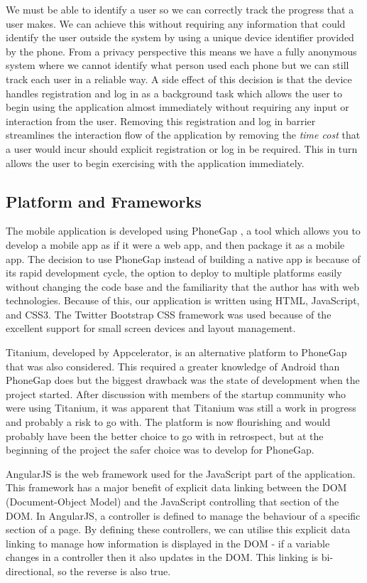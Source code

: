 We must be able to identify a user so we can correctly track the
progress that a user makes. We can achieve this without requiring any
information that could identify the user outside the system by using a
unique device identifier provided by the phone. From a privacy 
perspective this means we have a fully anonymous system where we
cannot identify what person used each phone but we can still track
each user in a reliable way. A side effect of this decision is that
the device handles registration and log in as a background task which
allows the user to begin using the application almost immediately
without requiring any input or interaction from the user. Removing
this registration and log in barrier streamlines the interaction flow
of the application by removing the \emph{time cost} that a user would
incur should explicit registration or log in be required. This in turn
allows the user to begin exercising with the application immediately.

\subsection{Platform and Frameworks}
The mobile application is developed using PhoneGap \cite{phonegap}, 
a tool which allows you to develop a mobile app as if it were
a web app, and then package it as a mobile app. The decision to use
PhoneGap instead of building a native app is because of its rapid
development cycle, the option to deploy to multiple platforms easily
without changing the code base and the familiarity that the author has
with web technologies. Because of this, our application is written
using HTML, JavaScript, and CSS3. The Twitter Bootstrap CSS framework
\cite{bootstrap} was used because of the excellent support for small
screen devices and layout management. 

Titanium, developed by Appcelerator\cite{titanium}, is an alternative
platform to PhoneGap that was also considered. This required a greater
knowledge of Android than PhoneGap does but the biggest drawback was
the state of development when the project started. After discussion
with members of the startup community who were using Titanium, it was
apparent that Titanium was still a work in progress and probably a
risk to go with. The platform is now flourishing and would probably
have been the better choice to go with in retrospect, but at the
beginning of the project the safer choice was to develop for PhoneGap.

AngularJS\cite{angularjs} is the web framework used for the
JavaScript part of the application. This framework has a major benefit
of explicit data linking between the DOM (Document-Object Model) and
the JavaScript controlling that section of the DOM. In AngularJS, a
controller is defined to manage the behaviour of a specific section of
a page. By defining these controllers, we can utilise this explicit
data linking to manage how information is displayed in the DOM - if a
variable changes in a controller then it also updates in the DOM. This
linking is bi-directional, so the reverse is also true. 

